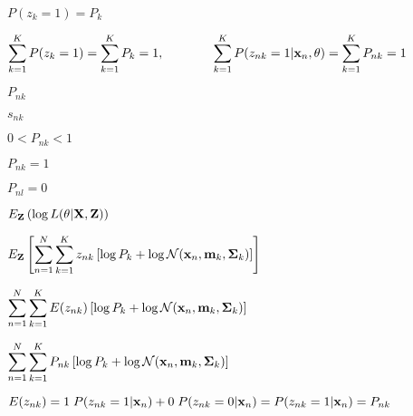 \documentclass{article}
\def\lthtmlcheckvsize{\ifdim\ht\sizebox<\vsize 
  \ifdim\wd\sizebox<\hsize\expandafter\hfill\fi \expandafter\vfill
  \else\expandafter\vss\fi}%
\begin{document}
{\newpage\clearpage
{}%
$ P(z_k=1)=P_k$%
\lthtmlindisplaymathZ
\lthtmlcheckvsize\clearpage}

{\newpage\clearpage
{}%
$\displaystyle \sum_{k=1}^K P(z_k=1)=\sum_{k=1}^K P_k=1,
\;\;\;\;\;\;\;\;\;\;\;\;\;\;
\sum_{k=1}^K P(z_{nk}=1|{\bf x}_n,\theta)=\sum_{k=1}^K P_{nk}=1$%
\lthtmlindisplaymathZ
\lthtmlcheckvsize\clearpage}

{\newpage\clearpage
{}%
$ P_{nk}$%
\lthtmlindisplaymathZ
\lthtmlcheckvsize\clearpage}

{\newpage\clearpage
{}%
$ s_{nk}$%
\lthtmlindisplaymathZ
\lthtmlcheckvsize\clearpage}

{\newpage\clearpage
{}%
$ 0<P_{nk}<1$%
\lthtmlindisplaymathZ
\lthtmlcheckvsize\clearpage}

{\newpage\clearpage
{}%
$ P_{nk}=1$%
\lthtmlindisplaymathZ
\lthtmlcheckvsize\clearpage}

{\newpage\clearpage
{}%
$ P_{nl}=0$%
\lthtmlindisplaymathZ
\lthtmlcheckvsize\clearpage}

{\newpage\clearpage
{}%
$\displaystyle E_{\bf Z}\left( \log L(\theta|{\bf X},{\bf Z}) \right)$%
\lthtmlindisplaymathZ
\lthtmlcheckvsize\clearpage}

{\newpage\clearpage
{}%
$\displaystyle E_{\bf Z}\left[\sum_{n=1}^N \sum_{k=1}^K z_{nk}
\left[\log P_k+\log {\cal N}({\bf x}_n,{\bf m}_k,{\bf\Sigma}_k)\right]\right]$%
\lthtmlindisplaymathZ
\lthtmlcheckvsize\clearpage}

{\newpage\clearpage
{}%
$\displaystyle \sum_{n=1}^N \sum_{k=1}^K E(z_{nk})
\left[\log P_k+\log {\cal N}({\bf x}_n,{\bf m}_k,{\bf\Sigma}_k)\right]$%
\lthtmlindisplaymathZ
\lthtmlcheckvsize\clearpage}

{\newpage\clearpage
{}%
$\displaystyle \sum_{n=1}^N \sum_{k=1}^K P_{nk}
\left[\log P_k+\log {\cal N}({\bf x}_n,{\bf m}_k,{\bf\Sigma}_k)\right]$%
\lthtmlindisplaymathZ
\lthtmlcheckvsize\clearpage}

{\newpage\clearpage
{}%
$\displaystyle E(z_{nk})=1\;P(z_{nk}=1|{\bf x}_n)+0\;P(z_{nk}=0|{\bf x}_n)
=P(z_{nk}=1|{\bf x}_n)=P_{nk}$%
\lthtmlindisplaymathZ
\lthtmlcheckvsize\clearpage}
\end{document}
